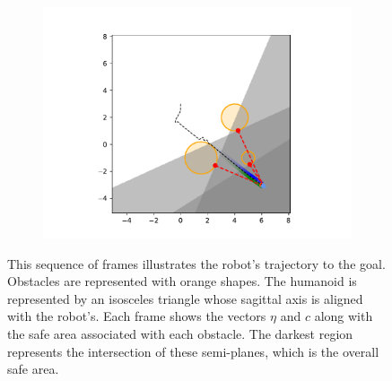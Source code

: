 \begin{figure}[h]
\begin{subfigure}{0.20\textwidth}
        \includegraphics[width=\textwidth]{figures/Simulations/sim1circles/frame_9.pdf}
    \end{subfigure}
    
    \caption[short]{This sequence of frames illustrates the robot's trajectory to the goal. Obstacles are represented with orange shapes. The humanoid is represented by an isosceles triangle whose sagittal axis is aligned with the robot's. Each frame shows the vectors $\eta$ and $c$ along with the safe area associated with each obstacle. The darkest region represents the intersection of these semi-planes, which is the overall safe area.}
    \label{fig:sim1_frames}
\end{figure}